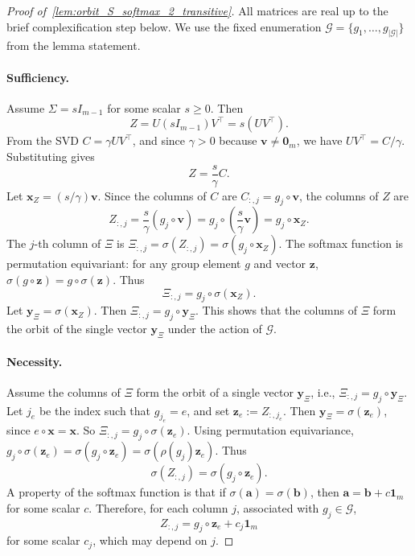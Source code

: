 \documentclass[11pt]{article}
\begin{document}
\begin{proof}[Proof of~\cref{lem:orbit_S_softmax_2_transitive}]
All matrices are real up to the brief complexification step below. We use the fixed enumeration \(\mathcal G=\{g_1,\ldots,g_{|\mathcal G|}\}\) from the lemma statement.

\paragraph{Sufficiency.}
Assume \(\Sigma = sI_{m-1}\) for some scalar \(s \ge 0\). Then
\[
Z = U(sI_{m-1})V^{\top} = s(UV^{\top}).
\]
From the SVD \(C = \gamma U V^{\top}\), and since \(\gamma > 0\) because \(\boldsymbol{v} \neq \boldsymbol{0}_m\), we have \(UV^{\top} = C/\gamma\). Substituting gives
\[
Z = \frac{s}{\gamma}C.
\]
Let \(\boldsymbol{x}_Z = (s/\gamma)\boldsymbol{v}\). Since the columns of \(C\) are \(C_{:,j} = g_j\circ\boldsymbol{v}\), the columns of \(Z\) are
\[
Z_{:,j}
= \frac{s}{\gamma}(g_j\circ\boldsymbol{v})
= g_j\circ\left(\frac{s}{\gamma}\boldsymbol{v}\right)
= g_j\circ\boldsymbol{x}_Z.
\]
The \(j\)-th column of \(\Xi\) is \(\Xi_{:,j} = \sigma(Z_{:,j}) = \sigma(g_j\circ\boldsymbol{x}_Z)\). The softmax function is permutation equivariant: for any group element \(g\) and vector \(\boldsymbol{z}\), \(\sigma(g\circ\boldsymbol{z}) = g\circ\sigma(\boldsymbol{z})\). Thus
\[
\Xi_{:,j} = g_j\circ\sigma(\boldsymbol{x}_Z).
\]
Let \(\boldsymbol{y}_{\Xi} = \sigma(\boldsymbol{x}_Z)\). Then \(\Xi_{:,j} = g_j\circ\boldsymbol{y}_{\Xi}\). This shows that the columns of \(\Xi\) form the orbit of the single vector \(\boldsymbol{y}_{\Xi}\) under the action of \(\mathcal G\).

\paragraph{Necessity.}
Assume the columns of \(\Xi\) form the orbit of a single vector \(\boldsymbol{y}_{\Xi}\), i.e., \(\Xi_{:,j} = g_j\circ\boldsymbol{y}_{\Xi}\). Let \(j_e\) be the index such that \(g_{j_e}=e\), and set \(\boldsymbol{z}_{e}:=Z_{:,j_e}\). Then \(\boldsymbol{y}_{\Xi} = \sigma(\boldsymbol{z}_{e})\), since \(e\circ\boldsymbol{x}=\boldsymbol{x}\). So \(\Xi_{:,j} = g_j\circ\sigma(\boldsymbol{z}_{e})\). Using permutation equivariance, \(g_j\circ\sigma(\boldsymbol{z}_{e}) = \sigma(g_j\circ\boldsymbol{z}_{e})=\sigma(\rho(g_j)\boldsymbol{z}_{e})\). Thus
\[
\sigma(Z_{:,j}) = \sigma(g_j\circ\boldsymbol{z}_{e}).
\]
A property of the softmax function is that if \(\sigma(\boldsymbol{a}) = \sigma(\boldsymbol{b})\), then \(\boldsymbol{a} = \boldsymbol{b} + c\boldsymbol{1}_m\) for some scalar \(c\). Therefore, for each column \(j\), associated with \(g_j \in \mathcal G\),
\[
Z_{:,j} = g_j\circ\boldsymbol{z}_{e} + c_j\boldsymbol{1}_m
\]
for some scalar \(c_j\), which may depend on \(j\).


\end{proof}
\end{document}
